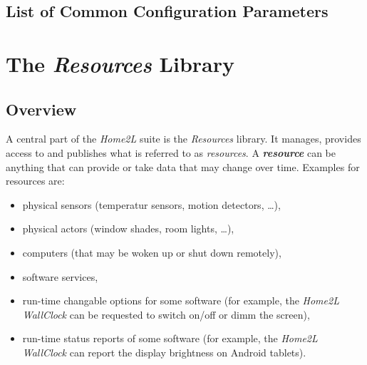 \documentclass[12pt,english,parskip=half]{scrreprt}
\begin{document}
\section{List of Common Configuration Parameters}
\label{sec:env-common}







%
\chapter{The \emph{Resources} Library}
\label{ch:resources}
%


\section{Overview}
\label{sec:resources-overview}


A central part of the \emph{Home2L} suite is the \emph{Resources}
library. It manages, provides access to and publishes what is referred
to as \emph{resources}. A \textbf{\emph{resource}} can be anything that can
provide or take data that may change over time.
Examples for resources are:

\begin{itemize}
\item
  physical sensors (temperatur sensors, motion detectors, \ldots{}),
\item
  physical actors (window shades, room lights, \ldots{}),
\item
  computers (that may be woken up or shut down remotely),
\item
  software services,
\item
  run-time changable options for some software (for example, the
  \emph{Home2L WallClock} can be requested to switch on/off or dimm the
  screen),
\item
  run-time status reports of some software (for example, the
  \emph{Home2L WallClock} can report the display brightness on Android
  tablets).
\end{itemize}
\end{document}
